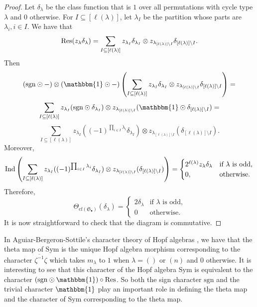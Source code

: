 \documentclass[11pt]{amsart}
\numberwithin{equation}{section}
\newcommand{\Sym}{\mathrm{Sym}}
\newcommand{\bbmone}{{\mathbbm{1}}}
\newcommand{\frakS}{{\mathfrak{S}}}
\newcommand{\cf}{{\mathrm{cf}}}
\newcommand{\sgn}{{\mathrm{sgn}}}
\begin{document}
\begin{proof}
Let $\delta_\lambda$ be the class function that is $1$ over all permutations with cycle type $\lambda$ and $0$ otherwise.   For $I\subseteq [\ell(\lambda)]$, let $\lambda_I$ be the partition whose parts are $\lambda_i, i\in I$. 
We have that 
$${\rm Res} (z_\lambda \delta_{\lambda})=\sum_{I \subseteq [\ell(\lambda)]}  z_{\lambda_I} \delta_{\lambda_I}\otimes z_{\lambda_{[\ell(\lambda)] \setminus I}} \delta_{[\ell(\lambda)] \setminus I}.$$
Then $$(\sgn\odot -)\otimes (\bbmone\odot -) \left(\sum_{I \subseteq [\ell(\lambda)]}  z_{\lambda_I} \delta_{\lambda_I}\otimes z_{\lambda_{[\ell(\lambda)] \setminus I}} \delta_{[\ell(\lambda)] \setminus I}\right) = $$
$$\sum_{I \subseteq [\ell(\lambda)]}  z_{\lambda_I} (\sgn\odot \delta_{\lambda_I})\otimes z_{\lambda_{[\ell(\lambda)] \setminus I}} (\bbmone\odot \delta_{[\ell(\lambda)] \setminus I}) =
$$
$$\sum_{I \subseteq [\ell(\lambda)]}  z_{\lambda_I} ((-1)^{\prod_{i\in I} \lambda_i} \delta_{\lambda_I})\otimes z_{\lambda_{[\ell(\lambda)] \setminus I}} (\delta_{[\ell(\lambda)] \setminus I}) .
$$
Moreover, $${\rm Ind}\left(\sum_{I \subseteq [\ell(\lambda)]}  z_{\lambda_I} ((-1)^{\prod_{i\in I} \lambda_i} \delta_{\lambda_I})\otimes z_{\lambda_{[\ell(\lambda)] \setminus I}} (\delta_{[\ell(\lambda)] \setminus I})\right) = \begin{cases} 2^{\ell(\lambda)}z_\lambda \delta_{\lambda} & \text{if $\lambda$ is odd,} \\ 0, & \text{otherwise.} \end{cases}$$
Therefore, 
$$\Theta_{\cf(\frakS_\bullet)}(\delta_{\lambda})=\begin{cases} 2 \delta_{\lambda} & \text{if $\lambda$ is odd,} \\ 0 & \text{otherwise.} \end{cases}$$
It is now straightforward to check that the diagram is commutative. 
\end{proof}

In Aguiar-Bergeron-Sottile's character theory of Hopf algebras \cite{A06}, we have that the theta map of $\Sym$ is the unique Hopf algebra morphism corresponding to the character $\overline{\zeta^{-1}}\zeta$ which takes $m_{\lambda}$ to $1$ when $\lambda=()$ or $(n)$ and $0$ otherwise. It is interesting to see that this character of the Hopf algebra $\Sym$ is equivalent to the character $(\sgn \odot \bbmone) \circ {\rm Res}$. So both the sign character $\sgn$ and the trivial character $\bbmone$ play an important role in defining the theta map and the character of $\Sym$ corresponding to the theta map. 
\end{document}
